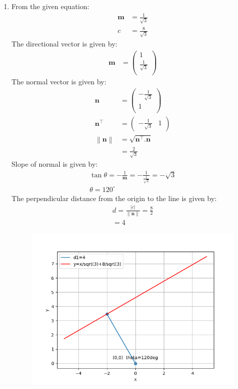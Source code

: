 \documentclass[12pt]{article}
\providecommand{\norm}[1]{\left\lVert#1\right\rVert}
\newcommand{\myvec}[1]{\ensuremath{\begin{pmatrix}#1\end{pmatrix}}}
\let\vec\mathbf
\begin{document}
\begin{enumerate}
\item From the given equation:
	\begin{align}
		\vec{m}&=\frac{1}{\sqrt{3}}\\
		c&=\frac{8}{\sqrt{3}}
	\end{align}
        The directional vector is given by:
	\begin{align}
		\vec{m}&=\myvec{1\\\frac{1}{\sqrt{3}}\\}
	\end{align}
	The normal vector is given by:
		\begin{align}
	\vec{n}&=\myvec{-\frac{1}{\sqrt{3}}\\1\\}\\
	\vec{n}^\top&=\myvec{-\frac{1}{\sqrt{3}} & 1}\\
			\norm{\vec{n}}&=\sqrt{\vec{n}^\top.\vec{n}}\\
			&=\frac{2}{\sqrt{3}}
			\end{align}
	Slope of normal is given by:
		\begin{align}
			\tan\theta=-\frac{1}{\vec{m}}=-\frac{1}{\frac{1}{\sqrt{3}}}=-\sqrt{3}\\
			\theta=120^\circ
		\end{align}
	The perpendicular distance from the origin to the line is given by:
		\begin{align}
			d=\frac{|c|}{\norm{\vec{n}}}=\frac{8}{2}\\
			=4
		\end{align}
\begin{figure}[!h]
	\begin{center} 
	    \includegraphics[width=\columnwidth]{./figs/line1.png}
	\end{center}
\caption{}
\label{fig:Fig}
\end{figure}
	


\end{enumerate}
\end{document}
